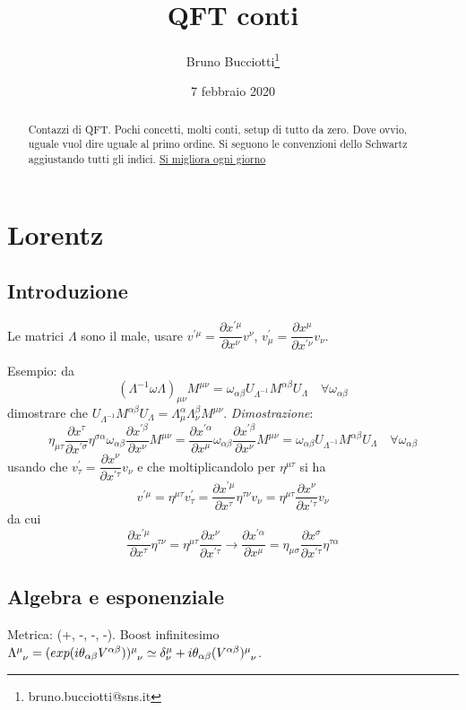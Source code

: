 \documentclass[12pt,a4paper]{article}
\author{Bruno Bucciotti\thanks{bruno.bucciotti@sns.it}}
\title{QFT conti}
\date{7 febbraio 2020}
\begin{document}
	\maketitle
	\begin{abstract}
	Contazzi di QFT. Pochi concetti, molti conti, setup di tutto da zero. Dove ovvio, uguale vuol dire uguale al primo ordine. Si seguono le convenzioni dello Schwartz aggiustando tutti gli indici.
	\href{https://www.youtube.com/watch?v=jZ7oghC1Mro}{Si migliora ogni giorno}
	\end{abstract}

	\section{Lorentz}
	\subsection{Introduzione}
	Le matrici $\Lambda$ sono il male, usare $v^{'\mu} = \dfrac{\partial x^{'\mu}}{\partial x^\nu} v^\nu$, $v_\mu^{'} = \dfrac{\partial x^{\mu}}{\partial x^{'\nu}} v_\nu$.
	
	Esempio: da
	\[ (\Lambda^{-1} \omega \Lambda)_{\mu\nu} M^{\mu\nu} = \omega_{\alpha\beta} U_{\Lambda^{-1}} M^{\alpha\beta} U_\Lambda\quad\forall \omega_{\alpha\beta} \]
	dimostrare che $U_{\Lambda^{-1}} M^{\alpha\beta} U_\Lambda = \Lambda^\alpha_\mu \Lambda^\beta_\nu M^{\mu\nu}$. \emph{Dimostrazione}:
	\[ \eta_{\mu\tau} \dfrac{\partial x^\tau}{\partial x^{'\sigma}} \eta^{\sigma\alpha} \omega_{\alpha\beta} \dfrac{\partial x^{' \beta}}{\partial x^\nu} M^{\mu\nu} = \dfrac{\partial x^{'\alpha}}{\partial x^{\mu}} \omega_{\alpha\beta} \dfrac{\partial x^{' \beta}}{\partial x^\nu} M^{\mu\nu} = \omega_{\alpha\beta} U_{\Lambda^{-1}} M^{\alpha\beta} U_\Lambda\quad\forall \omega_{\alpha\beta}\]
	usando che $ v^{'}_\tau = \dfrac{\partial x^\nu}{\partial x^{'\tau}} v_\nu $ e che moltiplicandolo per $\eta^{\mu\tau}$ si ha
	\[ v^{'\mu} = \eta^{\mu\tau} v^{'}_\tau = \dfrac{\partial x^{'\mu}}{\partial x^{\tau}} \eta^{\tau\nu} v_\nu = \eta^{\mu\tau} \dfrac{\partial x^\nu}{\partial x^{'\tau}} v_\nu \]
	da cui
	\[ \dfrac{\partial x^{'\mu}}{\partial x^{\tau}} \eta^{\tau\nu} = \eta^{\mu\tau} \dfrac{\partial x^\nu}{\partial x^{'\tau}}\rightarrow
	\dfrac{\partial x^{'\alpha}}{\partial x^{\mu}} = \eta_{\mu\sigma} \dfrac{\partial x^{\sigma}}{\partial x^{'\tau}} \eta^{\tau\alpha} \]
	
	\subsection{Algebra e esponenziale}
	Metrica: (+, -, -, -). Boost infinitesimo $\Lambda\indices{^\mu_\nu} = (exp(i\theta_{\alpha\beta} V^{\alpha\beta}))\indices{^\mu_\nu} \simeq \delta^\mu_\nu + i\theta_{\alpha\beta} (V^{\alpha\beta})\indices{^\mu_\nu}$.
	
\end{document}
